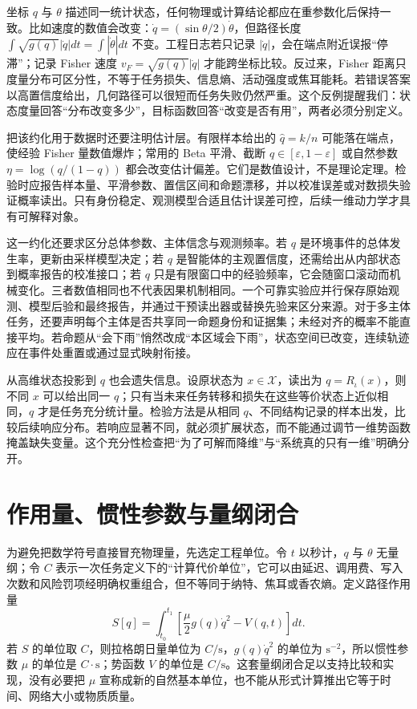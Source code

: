 坐标 $q$ 与 $\theta$ 描述同一统计状态，任何物理或计算结论都应在重参数化后保持一致。比如速度的数值会改变：$\dot q=(\sin\theta/2)\dot\theta$，但路径长度 $\int\sqrt{g(q)}|\dot q|dt=\int|\dot\theta|dt$ 不变。工程日志若只记录 $|\dot q|$，会在端点附近误报“停滞”；记录 Fisher 速度 $v_F=\sqrt{g(q)}|\dot q|$ 才能跨坐标比较。反过来，Fisher 距离只度量分布可区分性，不等于任务损失、信息熵、活动强度或焦耳能耗。若错误答案以高置信度给出，几何路径可以很短而任务失败仍然严重。这个反例提醒我们：状态度量回答“分布改变多少”，目标函数回答“改变是否有用”，两者必须分别定义。

把该约化用于数据时还要注明估计层。有限样本给出的 $\hat q=k/n$ 可能落在端点，使经验 Fisher 量数值爆炸；常用的 Beta 平滑、截断 $q\in[\varepsilon,1-\varepsilon]$ 或自然参数 $\eta=\log(q/(1-q))$ 都会改变估计偏差。它们是数值设计，不是理论定理。检验时应报告样本量、平滑参数、置信区间和命题漂移，并以校准误差或对数损失验证概率读出。只有身份稳定、观测模型合适且估计误差可控，后续一维动力学才具有可解释对象。

这一约化还要求区分总体参数、主体信念与观测频率。若 $q$ 是环境事件的总体发生率，更新由采样模型决定；若 $q$ 是智能体的主观置信度，还需给出从内部状态到概率报告的校准接口；若 $q$ 只是有限窗口中的经验频率，它会随窗口滚动而机械变化。三者数值相同也不代表因果机制相同。一个可靠实验应并行保存原始观测、模型后验和最终报告，并通过干预读出器或替换先验来区分来源。对于多主体任务，还要声明每个主体是否共享同一命题身份和证据集；未经对齐的概率不能直接平均。若命题从“会下雨”悄然改成“本区域会下雨”，状态空间已改变，连续轨迹应在事件处重置或通过显式映射衔接。

从高维状态投影到 $q$ 也会遗失信息。设原状态为 $x\in\mathcal X$，读出为 $q=R_\iota(x)$，则不同 $x$ 可以给出同一 $q$；只有当未来任务转移和损失在这些等价状态上近似相同，$q$ 才是任务充分统计量。检验方法是从相同 $q$、不同结构记录的样本出发，比较后续响应分布。若响应显著不同，就必须扩展状态，而不能通过调节一维势函数掩盖缺失变量。这个充分性检查把“为了可解而降维”与“系统真的只有一维”明确分开。

\section{作用量、惯性参数与量纲闭合}
\label{sec:cognitive_inertia_nert_mass}

为避免把数学符号直接冒充物理量，先选定工程单位。令 $t$ 以秒计，$q$ 与 $\theta$ 无量纲；令 $C$ 表示一次任务定义下的“计算代价单位”，它可以由延迟、调用费、写入次数和风险罚项经明确权重组合，但不等同于纳特、焦耳或香农熵。定义路径作用量
\[
S[q]=\int_{t_0}^{t_1}\left[\frac{\mu}{2}g(q)\dot q^2-V(q,t)\right]dt .
\]
若 $S$ 的单位取 $C$，则拉格朗日量单位为 $C/\mathrm{s}$，$g(q)\dot q^2$ 的单位为 $\mathrm{s}^{-2}$，所以惯性参数 $\mu$ 的单位是 $C\!\cdot\!\mathrm{s}$；势函数 $V$ 的单位是 $C/\mathrm{s}$。这套量纲闭合足以支持比较和实现，没有必要把 $\mu$ 宣称成新的自然基本单位，也不能从形式计算推出它等于时间、网络大小或物质质量。

